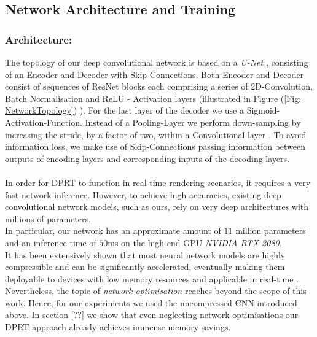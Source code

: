 \subsection{ Network Architecture and Training}

\subsubsection*{Architecture: \\} 
The topology of our deep convolutional network is based on a \textit{U-Net}  \cite{U-Net}, consisting of an Encoder and Decoder with Skip-Connections. Both Encoder and Decoder consist of sequences of ResNet blocks \cite{ResNet} each comprising a series of 2D-Convolution, Batch Normalisation and ReLU - Activation layers (illustrated in Figure (\ref{Fig: NetworkTopology}) ). For the last layer of the decoder we use a Sigmoid-Activation-Function. Instead of a Pooling-Layer we perform down-sampling by increasing the stride, by a factor of two, within a Convolutional layer \cite{StridingConv}. To avoid information loss,  we make use of Skip-Connections passing information between outputs of encoding layers and corresponding inputs of the decoding layers. 
\\
\\
In order for DPRT to function in real-time rendering scenarios, it requires a very fast network inference. However, to achieve high accuracies, existing deep convolutional network models, such as ours, rely on very deep architectures with millions of parameters. 
\\
In particular, our network has an approximate amount of $11$ million parameters and an inference time of $50$ms on the high-end GPU \textit{NVIDIA RTX 2080}. 
\\
It has been extensively shown that most neural network models are highly compressible and can be significantly accelerated, eventually making them deployable to devices with low memory resources and applicable in real-time \cite{Deep_Compression, Survey_NN_Compression}.
\\
Nevertheless, the topic of \textit{network optimisation} reaches beyond the scope of this work. Hence, for our experiments we used the uncompressed CNN introduced above. In section [??] we show that even neglecting network optimisations our DPRT-approach already achieves immense memory savings. 

